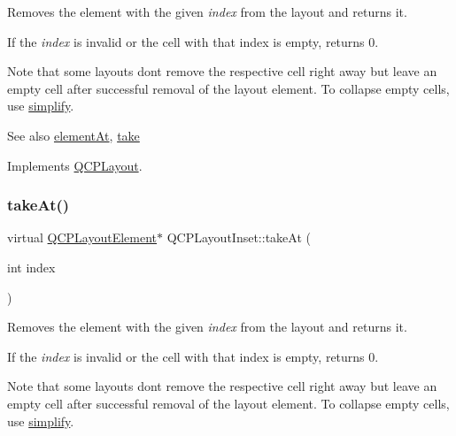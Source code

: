 Removes the element with the given {\itshape index} from the layout and returns it.

If the {\itshape index} is invalid or the cell with that index is empty, returns 0.

Note that some layouts don\textquotesingle{}t remove the respective cell right away but leave an empty cell after successful removal of the layout element. To collapse empty cells, use \hyperlink{class_q_c_p_layout_inset_a18b7d508f0baa60cc5dcb1343cf7f32a}{simplify}.

\begin{DoxySeeAlso}{See also}
\hyperlink{class_q_c_p_layout_inset_a881ca205605bae9c034733b808f93a02}{element\+At}, \hyperlink{class_q_c_p_layout_inset_af7f13cc369f8190b5e7e17d5f39dfe1c}{take} 
\end{DoxySeeAlso}


Implements \hyperlink{class_q_c_p_layout_a5a79621fa0a6eabb8b520cfc04fb601a}{Q\+C\+P\+Layout}.

\mbox{\label{class_q_c_p_layout_inset_ac95e930d304c7f07d9948f35172a396a}} 
\subsubsection{\texorpdfstring{take\+At()}{takeAt()}\hspace{0.1cm}{\footnotesize\ttfamily [2/2]}}
{\footnotesize\ttfamily virtual \hyperlink{class_q_c_p_layout_element}{Q\+C\+P\+Layout\+Element}$\ast$ Q\+C\+P\+Layout\+Inset\+::take\+At (\begin{DoxyParamCaption}\item[{int}]{index }\end{DoxyParamCaption})\hspace{0.3cm}{\ttfamily [virtual]}}

Removes the element with the given {\itshape index} from the layout and returns it.

If the {\itshape index} is invalid or the cell with that index is empty, returns 0.

Note that some layouts don\textquotesingle{}t remove the respective cell right away but leave an empty cell after successful removal of the layout element. To collapse empty cells, use \hyperlink{class_q_c_p_layout_inset_a18b7d508f0baa60cc5dcb1343cf7f32a}{simplify}.

